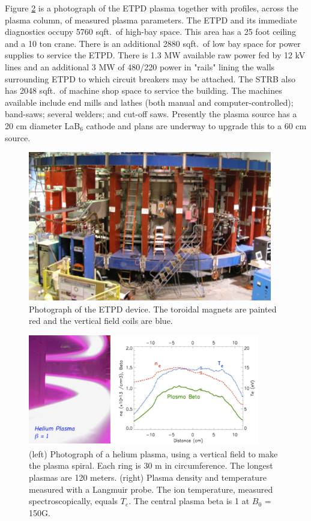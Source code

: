 \documentclass[11pt]{article}
\begin{document}
Figure \ref{fig:etpd2} is a photograph of the ETPD plasma together with profiles, across the plasma column, of measured plasma parameters.  The ETPD and its immediate diagnostics occupy 5760 sqft.\ of high-bay space.  This area has a 25 foot ceiling and a 10 ton crane.  There is an additional 2880 sqft.\ of low bay space for power supplies to service the ETPD.  There is 1.3 MW available raw power fed by 12 kV lines and an additional 3 MW of 480/220 power in "rails" lining the walls surrounding ETPD to which circuit breakers may be attached.  The STRB also has 2048 sqft.\ of machine shop space to service the building.  The machines available include end mills and lathes (both manual and computer-controlled); band-saws; several welders; and cut-off saws.  Presently the plasma source has a 20 cm diameter LaB$_{6}$ cathode and plans are underway to upgrade this to a 60 cm source.
\begin{figure}[h] %
   \centering
   \includegraphics[width=0.95\textwidth]{ETPD.jpg} 
   \caption{Photograph of the ETPD device.  The toroidal magnets are painted red and the vertical field coils are blue.}
   \label{fig:etpd}
\end{figure}
\begin{figure}[h] %
   \centering
   \includegraphics[width=0.9\textwidth]{etpd2.jpg} 
   \caption{ (left) Photograph of a helium plasma, using a vertical field to make the plasma spiral.  Each ring is 30 m in circumference.  The longest plasmas are 120 meters. (right) Plasma density and temperature measured with a Langmuir probe.  The ion temperature, measured spectroscopically, equals $T_{e}$. The central plasma beta is 1 at $B_{0}$ = 150G.  }
   \label{fig:etpd2}
\end{figure}
\end{document}
